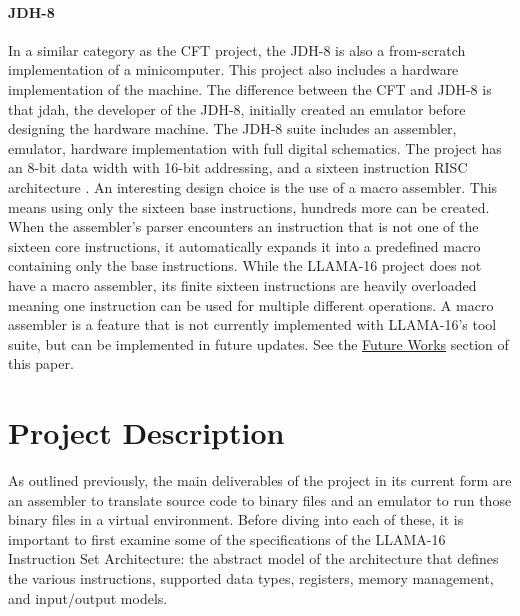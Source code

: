 \documentclass[man,hidelinks,floatsintext]{apa7}
\begin{document}
\paragraph{JDH-8}
In a similar category as the CFT project, the JDH-8 is also a from-scratch implementation of a minicomputer. This project also includes a hardware implementation of the machine. The difference between the CFT and JDH-8 is that jdah, the developer of the JDH-8, initially created an emulator before designing the hardware machine. The JDH-8 suite includes an assembler, emulator, hardware implementation with full digital schematics. The project has an 8-bit data width with 16-bit addressing, and a sixteen instruction RISC architecture \parencite{jdh}. An interesting design choice is the use of a macro assembler. This means using only the sixteen base instructions, hundreds more can be created. When the assembler's parser encounters an instruction that is not one of the sixteen core instructions, it automatically expands it into a predefined macro containing only the base instructions. While the LLAMA-16 project does not have a macro assembler, its finite sixteen instructions are heavily overloaded meaning one instruction can be used for multiple different operations. A macro assembler is a feature that is not currently implemented with LLAMA-16's tool suite, but can be implemented in future updates. See the \hyperref[sec:futurework]{Future Works} section  of this paper.
\section{Project Description}
As outlined previously, the main deliverables of the project in its current form are an assembler to translate source code to binary files and an emulator to run those binary files in a virtual environment. Before diving into each of these, it is important to first examine some of the specifications of the LLAMA-16 Instruction Set Architecture: the abstract model of the architecture that defines the various instructions, supported data types, registers, memory management, and input/output models.
\end{document}
